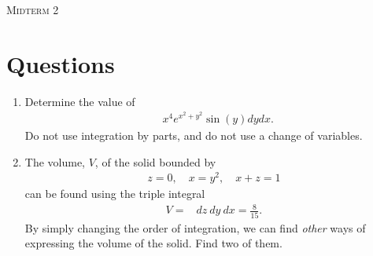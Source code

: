 \documentclass{article}
\date{}
\begin{document}
\begin{center}
\textsc{\LARGE Midterm 2}\\[0.5cm]
\end{center}
\section*{Questions}

\begin{enumerate}
\item %
Determine the value of
\begin{align*}
  \mathop{\int_0^{\pi} \!\! \int_{-1}^1} x^4e^{x^2 + y^2}\sin(y) dydx.
\end{align*}
Do not use integration by parts, and do not use a change of variables. 
\item %
The volume, $V$, of the solid bounded by
\begin{align*}
  z=0, \quad x=y^2, \quad x+z=1
\end{align*}
can be found using the triple integral 
\begin{align*}
  V = \mathop{\int_{0}^{1} \!\! \int_{-\sqrt{x}}^{\sqrt{x}} \! \int_0^{1-x} } dz\ dy\ dx = \frac{8}{15}.
\end{align*}
By simply changing the order of integration, we can find \textit{other} ways of expressing the volume of the solid. Find two of them. 


\end{enumerate}
\end{document}
